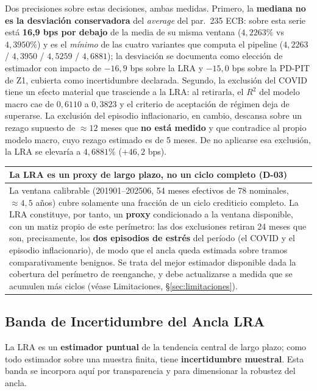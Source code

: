 \documentclass[12pt, a4paper]{article}
\newenvironment{recuadro}[1]
{\begin{center}\begin{tabular}{|p{0.92\textwidth}|}
\hline
\rowcolor{grissuave}
\textbf{#1} \\ \hline
}
{\\ \hline \end{tabular}\end{center}}
\begin{document}
\noindent Dos precisiones sobre estas decisiones, ambas medidas. Primero, la \textbf{mediana no es
la desviación conservadora} del \emph{average} del par.~235 ECB: sobre esta serie está
\textbf{16,9 bps por debajo} de la media de su misma ventana ($4{,}2263\%$ vs $4{,}3950\%$) y es el
\emph{mínimo} de las cuatro variantes que computa el pipeline
($4{,}2263$ / $4{,}3950$ / $4{,}5259$ / $4{,}6881$); la desviación se documenta como elección de
estimador con impacto de $-16{,}9$ bps sobre la LRA y $-15{,}0$ bps sobre la PD-PIT de Z1, cubierta
como incertidumbre declarada. Segundo, la exclusión del COVID tiene un efecto material que trasciende
a la LRA: al retirarla, el $R^2$ del modelo macro cae de $0{,}6110$ a $0{,}3823$ y el criterio de
aceptación de régimen deja de superarse. La exclusión del episodio inflacionario, en cambio,
descansa sobre un rezago supuesto de $\approx12$ meses que \textbf{no está medido} y que
contradice al propio modelo macro, cuyo rezago estimado es de 5 meses. De no aplicarse esa
exclusión, la LRA se elevaría a $4{,}6881\%$ ($+46{,}2$ bps).

\begin{recuadro}{La LRA es un proxy de largo plazo, no un ciclo completo (D-03)}
La ventana calibrable (201901--202506, 54 meses efectivos de 78 nominales, $\approx4{,}5$ años)
cubre solamente una fracción de un ciclo crediticio completo. La LRA constituye, por tanto, un
\textbf{proxy} condicionado a la ventana disponible, con un matiz propio de este perímetro: las
dos exclusiones retiran 24 meses que son, precisamente, los \textbf{dos episodios de estrés} del
período (el COVID y el episodio inflacionario), de modo que el ancla queda estimada sobre tramos
comparativamente benignos. Se trata del mejor estimador disponible dada la cobertura del perímetro
de reenganche, y debe actualizarse a medida que se acumulen más ciclos (véase Limitaciones,
\S\ref{sec:limitaciones}).
\end{recuadro}

\subsection{Banda de Incertidumbre del Ancla LRA}
\label{sec:bandalra}
La LRA es un \textbf{estimador puntual} de la tendencia central de largo plazo; como todo
estimador sobre una muestra finita, tiene \textbf{incertidumbre muestral}. Esta banda se incorpora
aquí por transparencia y para dimensionar la robustez del ancla.
\end{document}
